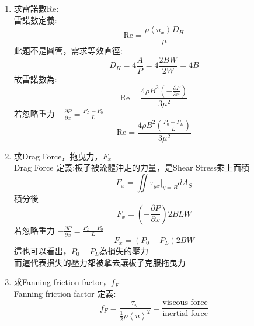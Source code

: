 \documentclass[../main.tex]{subfiles}
\begin{document}
\begin{itemize}
\begin{enumerate}
\begin{equation}
      \end{equation}
      若忽略重力 $ -\frac{\partial P}{\partial x} = \frac{P_L-P_0}{L}$
      \begin{equation}
        \boxed{Q = \frac{2B^3W}{3\mu}\left(\frac{P_0-P_L}{L}\right)}
      \end{equation}
    \item 求雷諾數Re:\\
      雷諾數定義:
      \begin{equation}
        \text{Re} = \frac{\rho \left<u_x\right> D_H}{\mu}
      \end{equation}
      此題不是圓管，需求等效直徑:
      \begin{equation}
        D_H = 4\frac{A}{P} = 4\frac{2BW}{2W} = 4B
      \end{equation}
      故雷諾數為:
      \begin{equation}
        \boxed{\text{Re} = \frac{4\rho B^2\left(-\frac{\partial P}{\partial x}\right)}{3\mu^2}}
      \end{equation}
      若忽略重力 $ -\frac{\partial P}{\partial x} = \frac{P_L-P_0}{L}$
      \begin{equation}
        \boxed{\text{Re} = \frac{4\rho B^2\left(\frac{P_0-P_L}{L}\right)}{3\mu^2}}
      \end{equation}
    \item 求Drag Force，拖曳力，$F_x$\\
      Drag Force 定義:板子被流體沖走的力量，是Shear Stress乘上面積
      \begin{equation}
        F_x = \iint \tau_{yx}|_{y=B} dA_S
      \end{equation}
      積分後
      \begin{equation}
        \boxed{F_x = \left(-\frac{\partial P}{\partial x}\right)2BLW}
      \end{equation}
      若忽略重力 $ -\frac{\partial P}{\partial x} = \frac{P_L-P_0}{L}$
      \begin{equation}
        \boxed{F_x = (P_0-P_L)2BW}
      \end{equation}
      這也可以看出，$P_0-P_L$為損失的壓力\\
      而這代表損失的壓力都被拿去讓板子克服拖曳力
    \item 求Fanning friction factor，$f_F$\\
      Fanning friction factor 定義:
      \begin{equation}
        f_F = \frac{\tau_{w}}{\frac{1}{2}\rho \left<u\right>^2} = \frac{\text{viscous force}}{\text{inertial force}}

\end{equation}
\end{enumerate}
\end{itemize}
\end{document}

